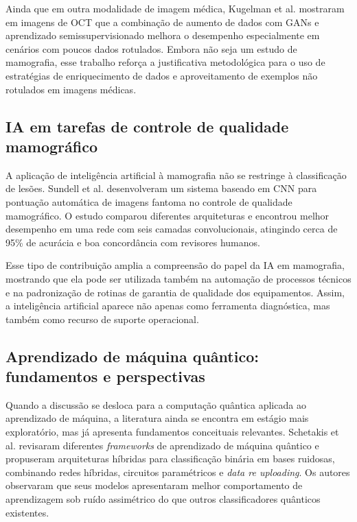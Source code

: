 Ainda que em outra modalidade de imagem médica, Kugelman et al. \cite{kugelman2024} mostraram em imagens de OCT que a combinação de aumento de dados com GANs e aprendizado semissupervisionado melhora o desempenho especialmente em cenários com poucos dados rotulados. Embora não seja um estudo de mamografia, esse trabalho reforça a justificativa metodológica para o uso de estratégias de enriquecimento de dados e aproveitamento de exemplos não rotulados em imagens médicas.

\subsection{IA em tarefas de controle de qualidade mamográfico}

A aplicação de inteligência artificial à mamografia não se restringe à classificação de lesões. Sundell et al. \cite{sundell2022} desenvolveram um sistema baseado em CNN para pontuação automática de imagens fantoma no controle de qualidade mamográfico. O estudo comparou diferentes arquiteturas e encontrou melhor desempenho em uma rede com seis camadas convolucionais, atingindo cerca de 95\% de acurácia e boa concordância com revisores humanos.

Esse tipo de contribuição amplia a compreensão do papel da IA em mamografia, mostrando que ela pode ser utilizada também na automação de processos técnicos e na padronização de rotinas de garantia de qualidade dos equipamentos. Assim, a inteligência artificial aparece não apenas como ferramenta diagnóstica, mas também como recurso de suporte operacional.

\subsection{Aprendizado de máquina quântico: fundamentos e perspectivas}

Quando a discussão se desloca para a computação quântica aplicada ao aprendizado de máquina, a literatura ainda se encontra em estágio mais exploratório, mas já apresenta fundamentos conceituais relevantes. Schetakis et al. \cite{schetakis2022} revisaram diferentes \textit{frameworks} de aprendizado de máquina quântico e propuseram arquiteturas híbridas para classificação binária em bases ruidosas, combinando redes híbridas, circuitos paramétricos e \textit{data re uploading}. Os autores observaram que seus modelos apresentaram melhor comportamento de aprendizagem sob ruído assimétrico do que outros classificadores quânticos existentes.

